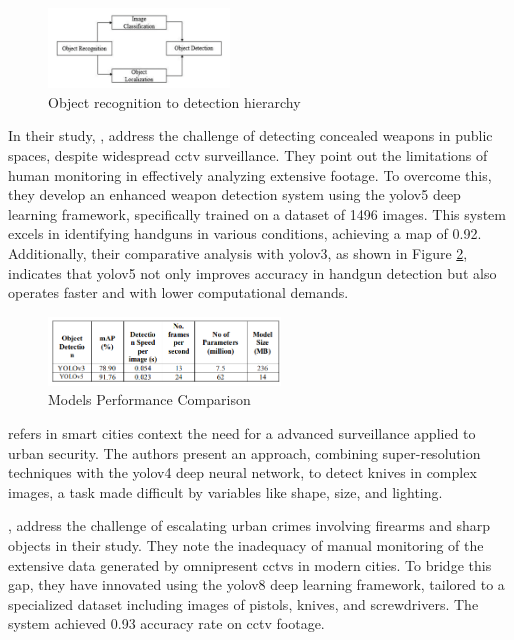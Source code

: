 \begin{figure}[ht]
    \centering 
    \includegraphics[width=0.43\textwidth]{figs/bhatti-chart.png} 
    \caption{Object recognition to detection hierarchy \cite{rfc4}}
    \label{fig:bhatti-chart}
\end{figure}

In their study, \citet{rfc5}, address the challenge of detecting concealed weapons in public spaces, despite widespread \ac{cctv} surveillance. They point out the limitations of human monitoring in effectively analyzing extensive footage. To overcome this, they develop an enhanced weapon detection system using the \ac{yolo}v5 deep learning framework, specifically trained on a dataset of 1496 images. This system excels in identifying handguns in various conditions, achieving a \ac{map} of 0.92. Additionally, their comparative analysis with \ac{yolo}v3, as shown in Figure \ref{fig:performance-Thangaraj}, indicates that \ac{yolo}v5 not only improves accuracy in handgun detection but also operates faster and with lower computational demands.

\begin{figure}[h]
    \centering 
    \includegraphics[width=0.55\textwidth]{figs/performance-Thangaraj.png} 
    \caption{Models Performance Comparison \cite{rfc5}}
    \label{fig:performance-Thangaraj}
\end{figure}

\citet{rfc18} refers in smart cities context the need for a advanced surveillance applied to urban security. The authors present an approach, combining super-resolution techniques with the \ac{yolo}v4 deep neural network, to detect knives in complex images, a task made difficult by variables like shape, size, and lighting.

\citet{rfc17}, address the challenge of escalating urban crimes involving firearms and sharp objects in their study. They note the inadequacy of manual monitoring of the extensive data generated by omnipresent \ac{cctv}s in modern cities. To bridge this gap, they have innovated using the \ac{yolo}v8 deep learning framework, tailored to a specialized dataset including images of pistols, knives, and screwdrivers. The system achieved 0.93 accuracy rate on \ac{cctv} footage.

